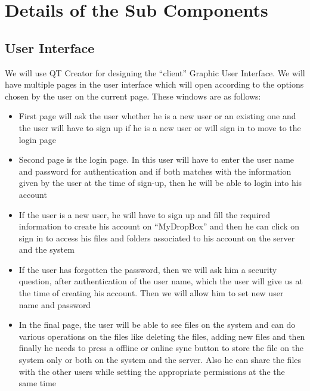 \documentclass{article}
\begin{document}
	\section{Details of the Sub Components}
		\subsection{User Interface}
		We will use QT Creator for designing the ``client'' Graphic User Interface. We will have multiple pages in the user interface which will open according to the options chosen by the user on the current page. These windows are as follows:
			\begin{itemize}
				\item First page will ask the user whether he is a new user or an existing one and the user will have to sign up if he is a new user or  will sign in to move to the login page
				\item Second page is the login page. In this user will have to enter the user name and password for authentication and if both matches with the information given by the user at the time of sign-up, then he will be able to login into his account
				\item If the user is a new user, he will have to sign up and fill the required information to create his account on ``MyDropBox'' and then he can click on sign in to access his files and folders associated to his account on the server and the system
				\item If the user has forgotten the password, then we will ask him a security question, after authentication of the user name, which the user will give us at the time of creating his account. Then we will allow him to set new user name and password
				\item In the final page, the user will be able to see files on the system and can do various operations on the files like deleting the files, adding new files and then finally he needs to press a offline or online sync button to store the file on the system only or both on the system and the server. Also he can share the files with the other users while setting the appropriate permissions at the the same time
			\end{itemize}
\end{document}
